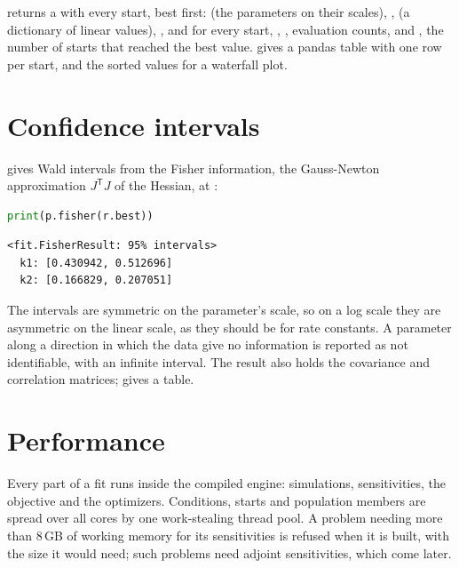  returns a  with every start, best first:  (the parameters on their scales),
,  (a dictionary of linear values), ,  and  for
every start, , , evaluation counts, and , the number of starts
that reached the best value.  gives a pandas table with one row per start, and
 the sorted values for a waterfall plot.

\section{Confidence intervals}

 gives Wald intervals from the Fisher information, the Gauss-Newton
approximation $J^\mathsf{T} J$ of the Hessian, at :

\begin{lstlisting}[language=Python]
print(p.fisher(r.best))
\end{lstlisting}
\begin{lstlisting}[style=out]
<fit.FisherResult: 95% intervals>
  k1: [0.430942, 0.512696]
  k2: [0.166829, 0.207051]
\end{lstlisting}

The intervals are symmetric on the parameter's scale, so on a log scale they are asymmetric on the linear scale,
as they should be for rate constants. A parameter along a direction in which the data give no information is
reported as not identifiable, with an infinite interval. The result also holds the covariance and correlation
matrices;  gives a table.

\section{Performance}

Every part of a fit runs inside the compiled engine: simulations, sensitivities, the objective and the
optimizers. Conditions, starts and population members are spread over all cores by one work-stealing thread
pool. A problem needing more than 8\,GB of working memory for its sensitivities is refused when it is built,
with the size it would need; such problems need adjoint sensitivities, which come later.
